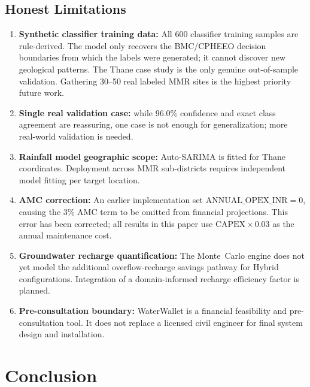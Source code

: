 \documentclass[conference]{IEEEtran}
\begin{document}
\subsection{Honest Limitations}
\label{sec:limitations}

\begin{enumerate}
  \item \textbf{Synthetic classifier training data:} All 600 classifier
    training samples are rule-derived. The model only recovers the BMC/CPHEEO
decision boundaries from which the labels were generated; it cannot discover
new geological patterns. The Thane case study is the only genuine
out-of-sample validation. Gathering 30–50 real labeled MMR sites is the highest
priority future work.

\item \textbf{Single real validation case:} while 96.0\% confidence and exact class agreement are reassuring,
one case is not enough for generalization; more real-world validation is needed.

  \item \textbf{Rainfall model geographic scope:} Auto-SARIMA is fitted for
    Thane coordinates. Deployment across MMR sub-districts requires
    independent model fitting per target location.

  \item \textbf{AMC correction:} An earlier implementation set
    $\text{ANNUAL\_OPEX\_INR} = 0$, causing the 3\% AMC term to be omitted
    from financial projections. This error has been corrected; all results
    in this paper use $\text{CAPEX} \times 0.03$ as the annual maintenance
    cost.

  \item \textbf{Groundwater recharge quantification:} The Monte~Carlo engine
    does not yet model the additional overflow-recharge savings pathway for
    Hybrid configurations. Integration of a domain-informed recharge
    efficiency factor is planned.

  \item \textbf{Pre-consultation boundary:} WaterWallet is a financial
    feasibility and pre-consultation tool. It does not replace a licensed
    civil engineer for final system design and installation.
\end{enumerate}

\section{Conclusion}
\label{sec:conclusion}
\end{document}
